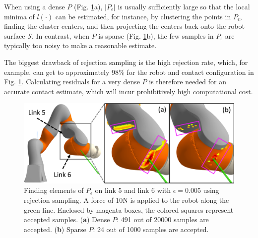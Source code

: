 When using a dense $P$ (Fig. \ref{fig:rejection_sampling}a), $|P_{\epsilon}|$ is usually sufficiently large so that the local minima of $l(\cdot)$ can be estimated, for instance, by clustering the points in $P_{\epsilon}$, finding the cluster centers, and then projecting the centers back onto the robot surface $\mathcal{S}$. In contrast, when $P$ is sparse (Fig. \ref{fig:rejection_sampling}b), the few samples in $P_{\epsilon}$ are typically too noisy to make a reasonable estimate. 

The biggest drawback of rejection sampling is the high rejection rate, which, for example, can get to approximately 98\% for the robot and contact configuration in Fig. \ref{fig:rejection_sampling}. Calculating residuals for a very dense $P$ is therefore needed for an accurate contact estimate, which will incur prohibitively high computational cost.
\begin{figure}[h]
    \centering
    \includegraphics[width=\linewidth]{figures/05_force_from_torque/rejection_sampling.png}
    \caption{Finding elements of $P_{\epsilon}$ on link 5 and link 6 with $\epsilon=0.005$ using rejection sampling. A force of $10\mathrm{N}$ is applied to the robot along the green line. Enclosed by magenta boxes, the colored squares represent accepted samples. (\textbf{a}) Dense $P$: 491 out of 20000 samples are accepted.  (\textbf{b}) Sparse $P$: 24 out of 1000 samples are accepted.}
    \label{fig:rejection_sampling}
    \vspace{-0.6cm}
\end{figure}

